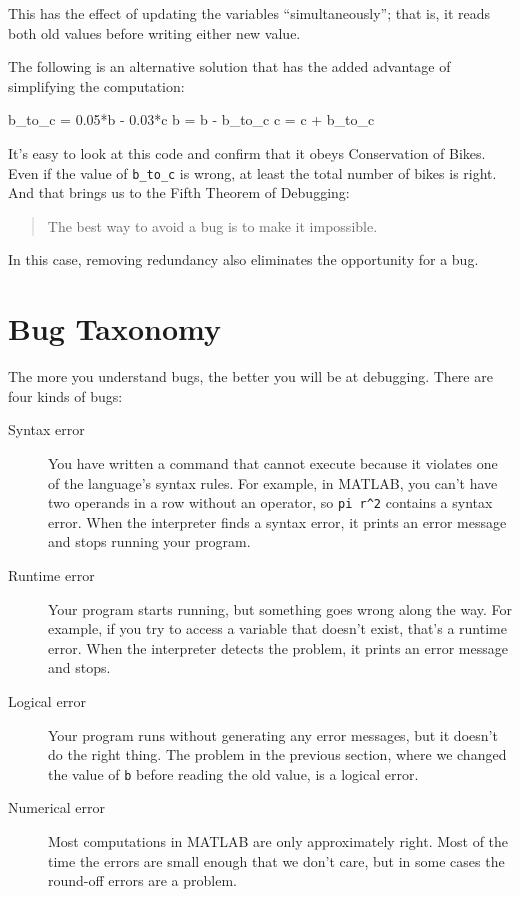 This has the effect of updating the variables ``simultaneously''; that
is, it reads both old values before writing either new value.


The following is an alternative solution that
has the added advantage of simplifying the computation:

\begin{code}
b_to_c = 0.05*b - 0.03*c
b = b - b_to_c
c = c + b_to_c
\end{code}

It's easy to look at this code and confirm that it obeys Conservation
of Bikes.  Even if the value of \lstinline{b_to_c} is wrong, at least the total
number of bikes is right.  And that brings us to the Fifth Theorem of
Debugging:

\begin{quote}
The best way to avoid a bug is to make it impossible.
\end{quote}
In this case, removing redundancy also eliminates the opportunity for a bug.

\section{Bug Taxonomy}

The more you understand bugs, the better you will be at debugging.
There are four kinds of bugs:


\begin{description}

\item[Syntax error] You have written a command that cannot
execute because it violates one of the language's syntax rules.  For example, in MATLAB,
you can't have two operands in a row without an operator, so
\lstinline{pi r^2} contains a syntax error.  When the interpreter finds a syntax
error, it prints an error message and stops running your program.

\item[Runtime error] Your program starts running, but something goes
wrong along the way.  For example, if you try to access a variable
that doesn't exist, that's a runtime error.  When the interpreter detects the
problem, it prints an error message and stops.

\item[Logical error] Your program runs without generating any error
messages, but it doesn't do the right thing.  The problem in the
previous section, where we changed the value of \lstinline{b} before
reading the old value, is a logical error.

\item[Numerical error] Most computations in MATLAB are only
approximately right.  Most of the time the errors are small enough
that we don't care, but in some cases the round-off errors are a problem.

\end{description}

